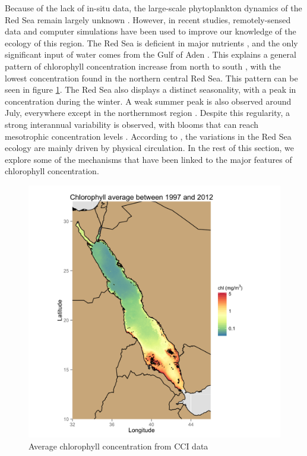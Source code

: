 Because of the lack of in-situ data, the large-scale phytoplankton dynamics of
the Red Sea remain largely unknown \citep{Raitsos2013, Triantafyllou2014}.
However, in recent studies, remotely-sensed data and computer simulations have
been used to improve our knowledge of the ecology of this region. The Red Sea
is deficient in major nutrients \citep{Weikert1987}, and the only significant
input of water comes from the Gulf of Aden \citep{Yao2015}. This explains a
general pattern of chlorophyll concentration increase from north to south
\citep{Raitsos2013}, with the lowest concentration found in the northern
central Red Sea. This pattern can be seen in figure \ref{meanchl}.
The Red Sea also displays a distinct seasonality, with a peak
in concentration during the winter.  A weak summer peak is also observed around
July, everywhere except in the northernmost region \citep{Raitsos2013}. Despite
this regularity, a strong interannual variability is observed, with blooms that
can reach mesotrophic concentration levels \citep{Raitsos2013}. According to
\citet{Triantafyllou2014}, the variations in the Red Sea ecology are mainly
driven by physical circulation. In the rest of this section, we explore some of
the mechanisms that have been linked to the major features of chlorophyll
concentration.

\begin{figure}[h]
    \centering
    \includegraphics[scale=.15]{figures/chl_average.png}
    \caption{Average chlorophyll concentration from CCI data}
    \label{meanchl}
\end{figure}

